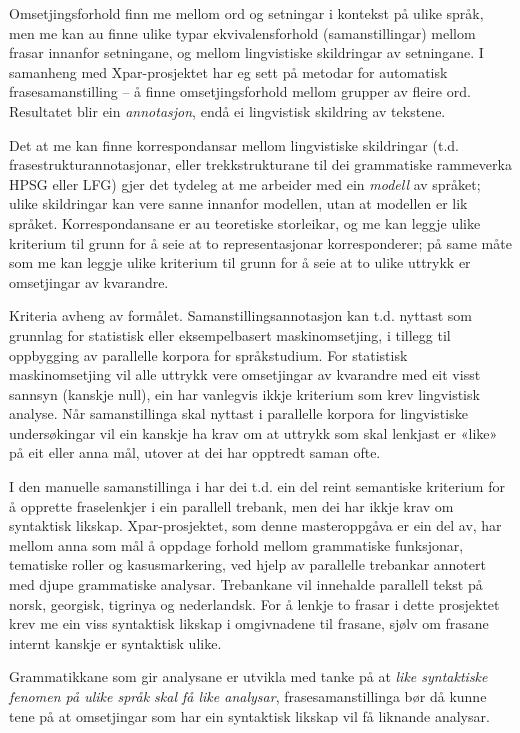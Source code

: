 \documentclass[11pt,a4paper,oneside,draft]{report}
\begin{document}
Omsetjingsforhold finn me mellom ord og setningar i kontekst på ulike
språk, men me kan au finne ulike typar ekvivalensforhold
(samanstillingar) mellom frasar innanfor setningane, og mellom
lingvistiske skildringar av setningane. I samanheng med
Xpar-prosjektet \citep{xpar2008rcn,dyvik2009lmp} har eg sett på metodar for
automatisk frasesamanstilling – å finne omsetjingsforhold mellom
grupper av fleire ord. Resultatet blir ein \emph{annotasjon}, endå ei
lingvistisk skildring av tekstene.



Det at me kan finne korrespondansar mellom lingvistiske skildringar
(t.d. frasestrukturannotasjonar, eller trekkstrukturane til dei
grammatiske rammeverka HPSG eller LFG) gjer det tydeleg at me arbeider
med ein \emph{modell} av språket; ulike skildringar kan vere sanne innanfor
modellen, utan at modellen er lik språket. Korrespondansane er au
teoretiske storleikar, og me kan leggje ulike kriterium til grunn for
å seie at to representasjonar korresponderer; på same måte som me kan
leggje ulike kriterium til grunn for å seie at to ulike uttrykk er
omsetjingar av kvarandre.

Kriteria avheng av formålet. Samanstillingsannotasjon kan t.d. nyttast
som grunnlag for statistisk eller eksempelbasert maskinomsetjing, i
tillegg til oppbygging av parallelle korpora for språkstudium.  For
statistisk maskinomsetjing vil alle uttrykk vere omsetjingar av
kvarandre med eit visst sannsyn (kanskje null), ein har vanlegvis
ikkje kriterium som krev lingvistisk analyse. Når samanstillinga skal
nyttast i parallelle korpora for lingvistiske undersøkingar vil ein
kanskje ha krav om at uttrykk som skal lenkjast er «like» på eit eller
anna mål, utover at dei har opptredt saman ofte.

I den manuelle samanstillinga i \citet{samuelsson2006pap} har dei
t.d. ein del reint semantiske kriterium for å opprette fraselenkjer i
ein parallell trebank, men dei har ikkje krav om syntaktisk likskap.
Xpar-prosjektet, som denne masteroppgåva er ein del av, har mellom
anna som mål å oppdage forhold mellom grammatiske funksjonar,
tematiske roller og kasusmarkering, ved hjelp av parallelle trebankar
annotert med djupe grammatiske analysar. Trebankane vil innehalde
parallell tekst på norsk, georgisk, tigrinya og nederlandsk.  For å
lenkje to frasar i dette prosjektet krev me ein viss syntaktisk
likskap i omgivnadene til frasane, sjølv om frasane internt kanskje er
syntaktisk ulike.  

Grammatikkane som gir analysane er utvikla med tanke på at \emph{like syntaktiske fenomen på ulike språk skal få like analysar},
frasesamanstillinga bør då kunne tene på at omsetjingar som har ein
syntaktisk likskap vil få liknande analysar.
\end{document}
